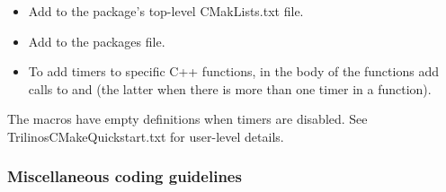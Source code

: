 \begin{itemize}
  \begin{itemize}

  {}\item Add
  {} to
  the package's top-level CMakLists.txt file.

  {}\item Add
  {} to
  the packages {} file.

  {}\item To add timers to specific C++ functions, in the body of the
  functions add calls to
  {} and
  {} (the latter when there is
  more than one timer in a function).

  \end{itemize}

The macros {} have
empty definitions when timers are disabled.  See
TrilinosCMakeQuickstart.txt for user-level details.

\end{itemize}


%
\subsubsection{Miscellaneous coding guidelines}
%

